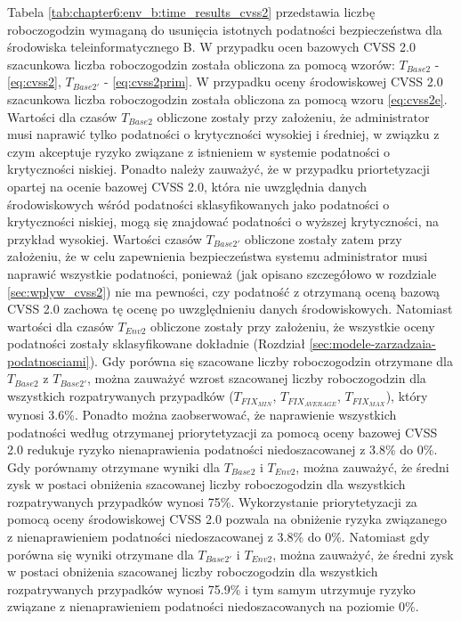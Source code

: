 \bigbreak
Tabela \ref{tab:chapter6:env_b:time_results_cvss2} przedstawia liczbę roboczogodzin wymaganą do usunięcia istotnych podatności bezpieczeństwa dla środowiska teleinformatycznego B. W przypadku ocen bazowych CVSS 2.0 szacunkowa liczba roboczogodzin została obliczona za pomocą wzorów: $T_{Base2}$ - \ref{eq:cvss2}, $T_{Base2'}$ - \ref{eq:cvss2prim}. W przypadku oceny środowiskowej CVSS 2.0 szacunkowa liczba roboczogodzin została obliczona za pomocą wzoru \ref{eq:cvss2e}. Wartości dla czasów $T_{Base2}$ obliczone zostały przy założeniu, że administrator musi naprawić tylko podatności o krytyczności wysokiej i średniej, w związku z czym akceptuje ryzyko związane z istnieniem w systemie podatności o krytyczności niskiej. Ponadto należy zauważyć, że w przypadku priortetyzacji opartej na ocenie bazowej CVSS 2.0, która nie uwzględnia danych środowiskowych wśród podatności sklasyfikowanych jako podatności o krytyczności niskiej, mogą się znajdować podatności o wyższej krytyczności, na przykład wysokiej. Wartości czasów $T_{Base2'}$ obliczone zostały zatem przy założeniu, że w celu zapewnienia bezpieczeństwa systemu administrator musi naprawić wszystkie podatności, ponieważ (jak opisano szczegółowo w rozdziale \ref{sec:wplyw_cvss2}) nie ma pewności, czy podatność z otrzymaną oceną bazową CVSS 2.0 zachowa tę ocenę po uwzględnieniu danych środowiskowych. Natomiast wartości dla czasów $T_{Env2}$ obliczone zostały przy założeniu, że wszystkie oceny podatności zostały sklasyfikowane dokładnie (Rozdział \ref{sec:modele-zarzadzaia-podatnosciami}). Gdy porówna się szacowane liczby roboczogodzin otrzymane dla $T_{Base2}$ z $T_{Base2'}$, można zauważyć wzrost szacowanej liczby roboczogodzin dla wszystkich rozpatrywanych przypadków ($T_{FIX_{MIN}}$, $T_{FIX_{AVERAGE}}$, $T_{FIX_{MAX}}$), który wynosi 3.6\%. Ponadto można zaobserwować, że naprawienie wszystkich podatności według otrzymanej priorytetyzacji za pomocą oceny bazowej CVSS 2.0 redukuje ryzyko nienaprawienia podatności niedoszacowanej z 3.8\% do 0\%. Gdy porównamy otrzymane wyniki dla $T_{Base2}$ i $T_{Env2}$, można zauważyć, że średni zysk w postaci obniżenia szacowanej liczby roboczogodzin dla wszystkich rozpatrywanych przypadków wynosi 75\%. Wykorzystanie priorytetyzacji za pomocą oceny środowiskowej CVSS 2.0 pozwala na obniżenie ryzyka związanego z nienaprawieniem podatności niedoszacowanej z 3.8\% do 0\%. Natomiast gdy porówna się wyniki otrzymane dla $T_{Base2'}$ i $T_{Env2}$, można zauważyć, że średni zysk w postaci obniżenia szacowanej liczby roboczogodzin dla wszystkich rozpatrywanych przypadków wynosi 75.9\% i tym samym utrzymuje ryzyko związane z nienaprawieniem podatności niedoszacowanych na poziomie 0\%.

